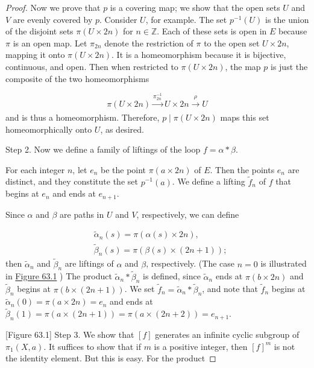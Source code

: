 \begin{proof}
Now we prove that \(p\) is a covering map; we show that the open sets \(U\) and \(V\) are evenly covered by \(p\). Consider \(U\), for example. The set \(p^{-1}( U)\) is the union of the disjoint sets \(\pi ( {U \times {2n}})\) for \(n \in \mathbb{Z}\). Each of these sets is open in \(E\) because \(\pi\) is an open map. Let \({\pi }_{2n}\) denote the restriction of \(\pi\) to the open set \(U \times {2n}\), mapping it onto \(\pi ( {U \times {2n}})\). It is a homeomorphism because it is bijective, continuous, and open. Then when restricted to \(\pi ( {U \times {2n}})\), the map \(p\) is just the composite of the two homeomorphisms

\[
\pi ( {U \times {2n}}) \xrightarrow[]{{\pi }_{2n}^{-1}}U \times {2n}\overset{\rho }{ \rightarrow }U
\]
and is thus a homeomorphism. Therefore, \(p \mid \pi ( {U \times {2n}})\) maps this set homeomorphically onto \(U\), as desired.

Step 2. Now we define a family of liftings of the loop \(f = \alpha * \beta\).

For each integer \(n\), let \(e_{n}\) be the point \(\pi ( {a \times {2n}})\) of \(E\). Then the points \(e_{n}\) are distinct, and they constitute the set \(p^{-1}( a)\). We define a lifting \(\tilde{f}_{n}\) of \(f\) that begins at \(e_{n}\) and ends at \(e_{n + 1}\).

Since \(\alpha\) and \(\beta\) are paths in \(U\) and \(V\), respectively, we can define

\[
\begin{aligned} & \tilde{\alpha }_{n}( s) = \pi ( {\alpha ( s) \times {2n}}), \\ & \tilde{\beta }_{n}( s) = \pi ( {\beta ( s) \times ( {{2n} + 1}) }) ; \end{aligned}
\]
then \(\tilde{\alpha }_{n}\) and \(\tilde{\beta }_{n}\) are liftings of \(\alpha\) and \(\beta\), respectively. (The case \(n = 0\) is illustrated in \hyperref[fig:63.1]{Figure 63.1} ) The product \(\tilde{\alpha }_{n} * \tilde{\beta }_{n}\) is defined, since \(\tilde{\alpha }_{n}\) ends at \(\pi ( {b \times {2n}})\) and \(\tilde{\beta }_{n}\) begins at \(\pi ( {b \times ( {{2n} + 1}) })\). We set \(\tilde{f}_{n} = \tilde{\alpha }_{n} * \tilde{\beta }_{n}\), and note that \(\tilde{f}_{n}\) begins at \(\tilde{\alpha }_{n}( 0) = \pi ( {a \times {2n}}) = e_{n}\) and ends at \(\tilde{\beta }_{n}(1) = \pi ( {a \times ( {{2n} + 1}) }) = \pi ( {a \times ( {{2n} + 2}) }) = e_{n + 1}\).

[Figure 63.1]
Step 3. We show that \([ f]\) generates an infinite cyclic subgroup of \({\pi }_{1}( {X,a})\). It suffices to show that if \(m\) is a positive integer, then \({[ f] }^{m}\) is not the identity element. But this is easy. For the product


\end{proof}
